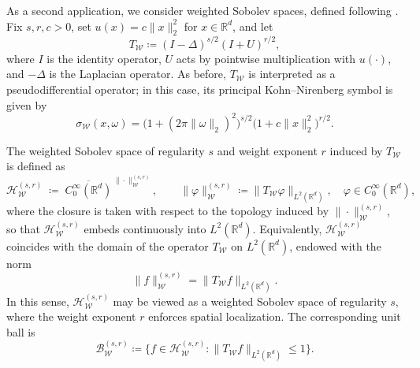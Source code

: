 \documentclass[a4paper,12pt]{article}
\let\originalleft\left
\let\originalright\right
\renewcommand{\left}{\mathopen{}\mathclose\bgroup\originalleft}
\renewcommand{\right}{\aftergroup\egroup\originalright}
\newcommand{\R}{\mathbb{R}}
\newcommand{\symbolnotsobw}{\symbolnot_{\mathcal{W}}}
\newcommand{\tsch}{T_{\mathcal{S}}}
\newcommand{\tweight}{T_{\mathcal{W}}}
\newcommand{\symbolnot}{\sigma}
\begin{document}
As a second application, we consider weighted Sobolev spaces, defined following
\cite[Section~3.3]{hinzmicrolocal}.
Fix $s,r,c>0$, set $u(x)=c\|x\|_2^2$ for $x\in\R^d$, and let
\begin{equation*}
    T_{\mathcal{W}}
    \coloneqq
    (I-\Delta)^{s/2}(I+U)^{r/2},
\end{equation*}
where $I$ is the identity operator, $U$ acts by pointwise multiplication with $u(\cdot)$,
and $-\Delta$ is the Laplacian operator.
As before, $T_{\mathcal{W}}$ is interpreted as a pseudodifferential operator; in
this case, its principal Kohn--Nirenberg symbol is given by
\begin{equation}\label{eq:symb-sob-weight-inverse}
    \sigma_{\mathcal{W}}(x,\omega)
    =
    \bigl(1+(2\pi\|\omega\|_2)^2\bigr)^{s/2}
    \bigl(1+c\|x\|_2^2\bigr)^{r/2}.
\end{equation}









The weighted Sobolev space of regularity $s$ and weight exponent $r$ induced by
$T_{\mathcal{W}}$ is defined as
\[
\mathcal{H}_{\mathcal{W}}^{(s,r)}
\;\coloneqq\;
\overline{C_0^\infty(\R^d)}^{\,\|\cdot\|_{\mathcal{W}}^{(s,r)}},
\qquad
\|\varphi\|_{\mathcal{W}}^{(s,r)}
\coloneqq
\|T_{\mathcal{W}}\varphi\|_{L^2(\R^d)},
\quad \varphi\in C_0^\infty(\R^d),
\]
where the closure is taken with respect to the topology induced by
$\|\cdot\|_{\mathcal{W}}^{(s,r)}$, so that
$\mathcal{H}_{\mathcal{W}}^{(s,r)}$ embeds continuously into $L^2(\R^d)$.
Equivalently, $\mathcal{H}_{\mathcal{W}}^{(s,r)}$ coincides with the domain of the
operator $T_{\mathcal{W}}$ on $L^2(\R^d)$, endowed with the norm
\[
\|f\|_{\mathcal{W}}^{(s,r)}=\|T_{\mathcal{W}}f\|_{L^2(\R^d)}.
\]
In this sense, $\mathcal{H}_{\mathcal{W}}^{(s,r)}$ may be viewed as a weighted
Sobolev space of regularity $s$, where the weight exponent $r$ enforces spatial
localization.
The corresponding unit ball is
\begin{equation}\label{eq:definition-ballweight}
    \mathcal{B}_{\mathcal{W}}^{(s,r)}
    \coloneqq
    \bigl\{f\in\mathcal{H}_{\mathcal{W}}^{(s,r)}:
    \|T_{\mathcal{W}}f\|_{L^2(\R^d)}\le 1\bigr\}.
\end{equation}
\end{document}
